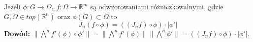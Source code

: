 \begin{lem}
	Jeżeli $\phi: G \rightarrow \Omega, \; f: \Omega \rightarrow \mathbb{R}^m$ są odwzorowaniami różniczkowalnymi, gdzie $G, \Omega \in top(\mathbb{R}^n)$ oraz $\phi(G) \subset \Omega$ to $$
		J_n (f \circ \phi) = ((J_nf) \circ \phi) \cdot |\phi'| 
	$$
	\textbf{Dowód:}\newline
	$\| \bigwedge^n f'(\phi) \circ \phi' \| = \| \bigwedge^n f'(\phi) \| \| \bigwedge^n \phi' \| = ((J_nf) \circ \phi) \cdot |\phi'|$. 
\end{lem}